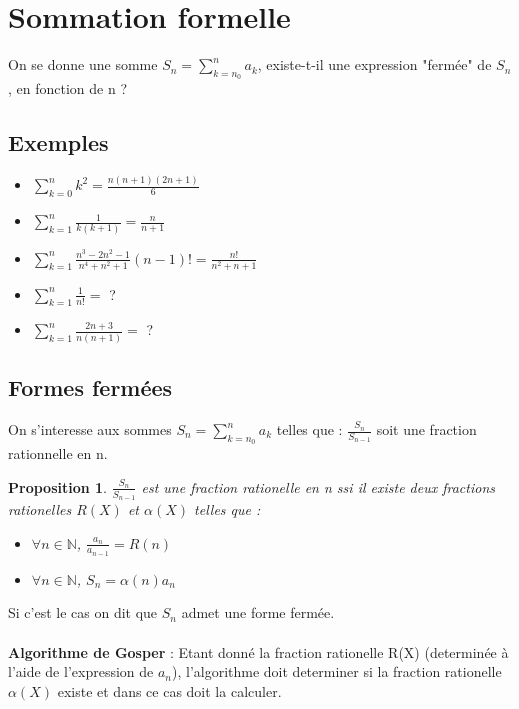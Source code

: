\documentclass[17 pt]{scrartcl}
\newtheorem{prop}{Proposition}
\begin{document}
	\section*{Sommation formelle}
	
	On se donne une somme $S_n = \sum_{k=n_0}^n {a_k} $, existe-t-il une expression "fermée" de $S_n$, en fonction de n ?
	
    \subsection*{Exemples}
    	\begin{itemize}
    		\item $\sum_{k=0}^n k^2 = \frac{n(n+1)(2n+1)}{6}$\\
    		
		\item $\sum_{k=1}^n \frac{1}{k(k+1)} = \frac{n}{n+1}$\\
			
		\item $ \sum_{k=1}^n {\frac{n^3-2n^2-1}{n^4+n^2+1}(n-1)!} = \frac{n!}{n^2+n+1}$\\
		
		\item $ \sum_{k=1}^n {\frac{1}{n!}} = $ ? \\
		\item $ \sum_{k=1}^n {\frac{2n+3}{n(n+1)}} = $ ? \\
	\end{itemize}
	
	\subsection*{Formes fermées}
	On s'interesse aux sommes  $S_n = \sum_{k=n_0}^n {a_k} $ telles que : $\frac{S_n}{S_{n-1}}$ soit une fraction rationnelle en n.
	
	\begin{prop}
	 $\frac{S_n}{S_{n-1}}$ est une fraction rationelle en n ssi il existe deux fractions rationelles $R(X)$ et $\alpha(X)$ telles que : 
	 \begin{itemize}
	 \item $\forall n \in \mathbb{N}$, $\frac{a_n}{a_{n-1}} = R(n)$
	 \item $\forall n \in \mathbb{N}$, $S_n = \alpha(n)a_n$
	 \end{itemize}
	\end{prop}

	Si c'est le cas on dit que $S_n$ admet une forme fermée.\\ \\
	\textbf{Algorithme de Gosper} :
		Etant donné la fraction rationelle R(X) (determinée à l'aide de l'expression de $a_n$), l'algorithme doit determiner si la fraction rationelle $\alpha(X)$ existe et dans ce cas doit la calculer.
		\newpage
\end{document}
